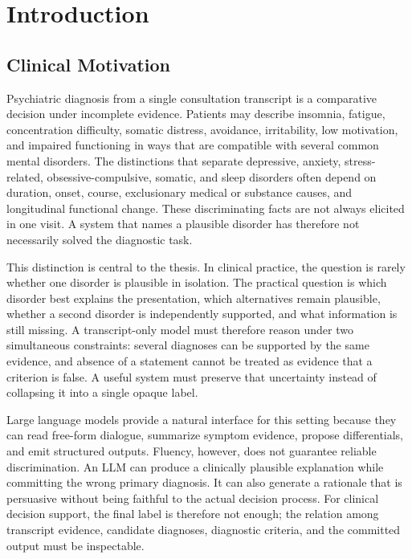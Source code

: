 \chapter{Introduction}
\label{ch:introduction}

\section{Clinical Motivation}

Psychiatric diagnosis from a single consultation transcript is a comparative decision under incomplete evidence. Patients may describe insomnia, fatigue, concentration difficulty, somatic distress, avoidance, irritability, low motivation, and impaired functioning in ways that are compatible with several common mental disorders. The distinctions that separate depressive, anxiety, stress-related, obsessive-compulsive, somatic, and sleep disorders often depend on duration, onset, course, exclusionary medical or substance causes, and longitudinal functional change. These discriminating facts are not always elicited in one visit. A system that names a plausible disorder has therefore not necessarily solved the diagnostic task.

This distinction is central to the thesis. In clinical practice, the question is rarely whether one disorder is plausible in isolation. The practical question is which disorder best explains the presentation, which alternatives remain plausible, whether a second disorder is independently supported, and what information is still missing. A transcript-only model must therefore reason under two simultaneous constraints: several diagnoses can be supported by the same evidence, and absence of a statement cannot be treated as evidence that a criterion is false. A useful system must preserve that uncertainty instead of collapsing it into a single opaque label.

Large language models provide a natural interface for this setting because they can read free-form dialogue, summarize symptom evidence, propose differentials, and emit structured outputs. Fluency, however, does not guarantee reliable discrimination. An LLM can produce a clinically plausible explanation while committing the wrong primary diagnosis. It can also generate a rationale that is persuasive without being faithful to the actual decision process. For clinical decision support, the final label is therefore not enough; the relation among transcript evidence, candidate diagnoses, diagnostic criteria, and the committed output must be inspectable.

